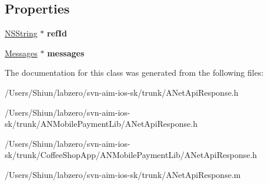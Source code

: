 \subsection*{Properties}
\begin{DoxyCompactItemize}
\item 
\hypertarget{interface_a_net_api_response_a9733d70e2ea71673a98d59163cd58cbb}{
\hyperlink{class_n_s_string}{NSString} $\ast$ {\bfseries refId}}
\label{interface_a_net_api_response_a9733d70e2ea71673a98d59163cd58cbb}

\item 
\hypertarget{interface_a_net_api_response_ae4f959d6e4ba59d321eb3eef951e957e}{
\hyperlink{interface_messages}{Messages} $\ast$ {\bfseries messages}}
\label{interface_a_net_api_response_ae4f959d6e4ba59d321eb3eef951e957e}

\end{DoxyCompactItemize}


The documentation for this class was generated from the following files:\begin{DoxyCompactItemize}
\item 
/Users/Shiun/labzero/svn-\/aim-\/ios-\/sk/trunk/ANetApiResponse.h\item 
/Users/Shiun/labzero/svn-\/aim-\/ios-\/sk/trunk/ANMobilePaymentLib/ANetApiResponse.h\item 
/Users/Shiun/labzero/svn-\/aim-\/ios-\/sk/trunk/CoffeeShopApp/ANMobilePaymentLib/ANetApiResponse.h\item 
/Users/Shiun/labzero/svn-\/aim-\/ios-\/sk/trunk/ANetApiResponse.m\end{DoxyCompactItemize}
